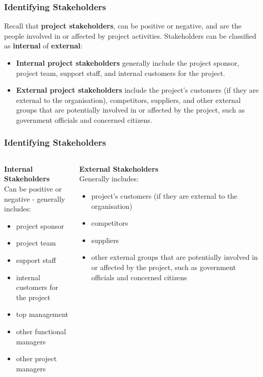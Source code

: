 \documentclass{beamer}
\begin{document}
\begin{frame}
\frametitle{Identifying Stakeholders}
Recall that \textbf{project stakeholders}, can be positive or negative, and are the people involved in or affected by project activities. Stakeholders can be classified as \textbf{internal} of \textbf{external}:
\vspace{0.5cm}
\begin{itemize}
\item \textbf{Internal project stakeholders} generally include the project sponsor, project team, support staff, and internal customers for the project.
\item \textbf{External project stakeholders} include the project's customers (if they are external to the organisation), competitors, suppliers, and other external groups that are potentially involved in or affected by the project, such as government officials and concerned citizens.
\end{itemize}
\end{frame}

\begin{frame}
\frametitle{Identifying Stakeholders}
\begin{columns}[t]
\begin{tcolorbox}
\textbf{Internal Stakeholders}\\

\footnotesize Can be positive or negative - generally includes:
\begin{itemize}
\item project sponsor
\item project team
\item support staff
\item internal customers for the project
\item top management
\item other functional managers
\item other project managers
\end{itemize}
\end{tcolorbox}
\begin{tcolorbox}
\textbf{External Stakeholders}\\

\footnotesize Generally includes:
\begin{itemize}
\item project's customers (if they are external to the organisation)
\item competitors
\item suppliers
\item other external groups that are potentially involved in or affected by the project, such as government officials and concerned citizens
\end{itemize}
\end{tcolorbox}
\end{columns}
\end{frame}
\end{document}
